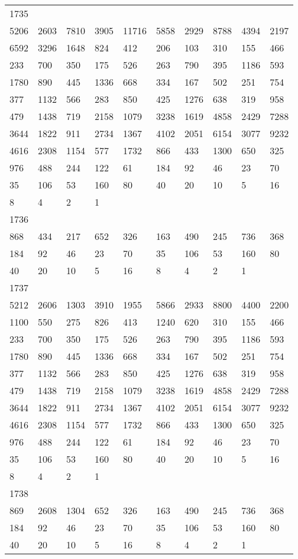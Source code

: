 \begin{longtable}{*{10}{l}}
1735&&&&&&&&&\\
5206& 2603& 7810& 3905& 11716& 5858& 2929& 8788& 4394& 2197\\
6592& 3296& 1648& 824& 412& 206& 103& 310& 155& 466\\
233& 700& 350& 175& 526& 263& 790& 395& 1186& 593\\
1780& 890& 445& 1336& 668& 334& 167& 502& 251& 754\\
377& 1132& 566& 283& 850& 425& 1276& 638& 319& 958\\
479& 1438& 719& 2158& 1079& 3238& 1619& 4858& 2429& 7288\\
3644& 1822& 911& 2734& 1367& 4102& 2051& 6154& 3077& 9232\\
4616& 2308& 1154& 577& 1732& 866& 433& 1300& 650& 325\\
976& 488& 244& 122& 61& 184& 92& 46& 23& 70\\
35& 106& 53& 160& 80& 40& 20& 10& 5& 16\\
8& 4& 2& 1& \\

1736&&&&&&&&&\\
868& 434& 217& 652& 326& 163& 490& 245& 736& 368\\
184& 92& 46& 23& 70& 35& 106& 53& 160& 80\\
40& 20& 10& 5& 16& 8& 4& 2& 1& \\

1737&&&&&&&&&\\
5212& 2606& 1303& 3910& 1955& 5866& 2933& 8800& 4400& 2200\\
1100& 550& 275& 826& 413& 1240& 620& 310& 155& 466\\
233& 700& 350& 175& 526& 263& 790& 395& 1186& 593\\
1780& 890& 445& 1336& 668& 334& 167& 502& 251& 754\\
377& 1132& 566& 283& 850& 425& 1276& 638& 319& 958\\
479& 1438& 719& 2158& 1079& 3238& 1619& 4858& 2429& 7288\\
3644& 1822& 911& 2734& 1367& 4102& 2051& 6154& 3077& 9232\\
4616& 2308& 1154& 577& 1732& 866& 433& 1300& 650& 325\\
976& 488& 244& 122& 61& 184& 92& 46& 23& 70\\
35& 106& 53& 160& 80& 40& 20& 10& 5& 16\\
8& 4& 2& 1& \\

1738&&&&&&&&&\\
869& 2608& 1304& 652& 326& 163& 490& 245& 736& 368\\
184& 92& 46& 23& 70& 35& 106& 53& 160& 80\\
40& 20& 10& 5& 16& 8& 4& 2& 1& \\


\end{longtable}
